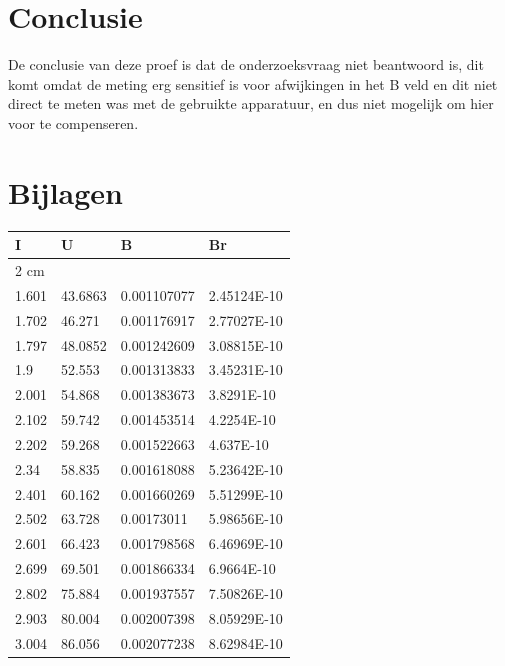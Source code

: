 \documentclass{article}
\begin{document}
\section{Conclusie}
De conclusie van deze proef is dat de onderzoeksvraag niet beantwoord is, dit komt omdat de meting erg sensitief is voor afwijkingen in het B veld en dit niet direct te meten was met de gebruikte apparatuur, en dus niet mogelijk om hier voor te compenseren. 

\nocite{*}
\printbibliography[title={Referenties}]


\section{Bijlagen}

    \centering
    \begin{longtable}{|l|l|l|l|}
    \hline
        I & U & B & Br \\ \hline
        2 cm & ~ & ~ & ~ \\ \hline
        1.601 & 43.6863 & 0.001107077 & 2.45124E-10 \\ \hline
        1.702 & 46.271 & 0.001176917 & 2.77027E-10 \\ \hline
        1.797 & 48.0852 & 0.001242609 & 3.08815E-10 \\ \hline
        1.9 & 52.553 & 0.001313833 & 3.45231E-10 \\ \hline
        2.001 & 54.868 & 0.001383673 & 3.8291E-10 \\ \hline
        2.102 & 59.742 & 0.001453514 & 4.2254E-10 \\ \hline
        2.202 & 59.268 & 0.001522663 & 4.637E-10 \\ \hline
        2.34 & 58.835 & 0.001618088 & 5.23642E-10 \\ \hline
        2.401 & 60.162 & 0.001660269 & 5.51299E-10 \\ \hline
        2.502 & 63.728 & 0.00173011 & 5.98656E-10 \\ \hline
        2.601 & 66.423 & 0.001798568 & 6.46969E-10 \\ \hline
        2.699 & 69.501 & 0.001866334 & 6.9664E-10 \\ \hline
        2.802 & 75.884 & 0.001937557 & 7.50826E-10 \\ \hline
        2.903 & 80.004 & 0.002007398 & 8.05929E-10 \\ \hline
        3.004 & 86.056 & 0.002077238 & 8.62984E-10 \\ \hline

\end{longtable}
\end{document}
